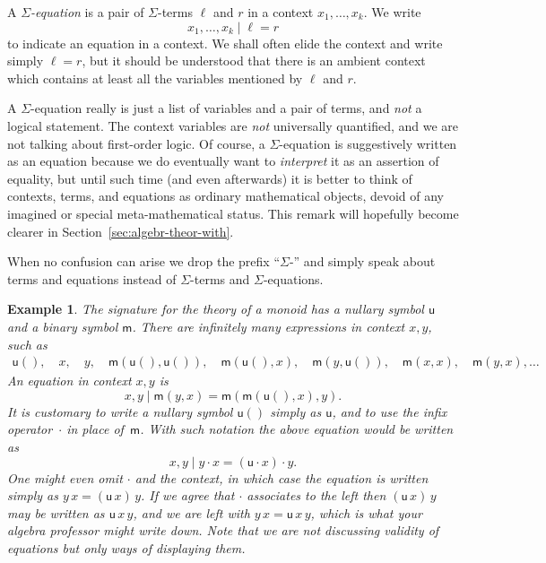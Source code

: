 \documentclass{amsart}
\newtheorem{example}{Example}[section]
\begin{document}
A \emph{$\Sigma$-equation} is a pair of $\Sigma$-terms $\ell$ and $r$ in a context
$x_1, \ldots, x_k$. We write
%
\begin{equation*}
  x_1, \ldots, x_k \mid \ell = r
\end{equation*}
%
to indicate an equation in a context. We shall often elide the context and write simply
$\ell = r$, but it should be understood that there is an ambient context which contains at
least all the variables mentioned by $\ell$ and $r$.

A $\Sigma$-equation really is just a list of variables and a pair of terms, and
\emph{not} a logical statement. The context variables are \emph{not} universally
quantified, and we are not talking about first-order logic. Of course, a
$\Sigma$-equation is suggestively written as an equation because we do
eventually want to \emph{interpret} it as an assertion of equality, but until
such time (and even afterwards) it is better to think of contexts, terms, and
equations as ordinary mathematical objects, devoid of any imagined or special
meta-mathematical status. This remark will hopefully become clearer in
Section~\ref{sec:algebr-theor-with}.

When no confusion can arise we drop the prefix ``$\Sigma$-'' and simply speak about
terms and equations instead of $\Sigma$-terms and $\Sigma$-equations.


\begin{example}
  \label{ex:monoid-signature}
  The signature for the theory of a monoid has a nullary symbol $\mathsf{u}$ and a binary
  symbol $\mathsf{m}$. There are infinitely many expressions in context $x, y$, such as
  \begin{align*}
    \mathsf{u}(),\quad
    x,\quad
    y,\quad
    \mathsf{m}(\mathsf{u}(), \mathsf{u}()),\quad
    \mathsf{m}(\mathsf{u}(), x),\quad
    \mathsf{m}(y, \mathsf{u}()),\quad
    \mathsf{m}(x, x),\quad
    \mathsf{m}(y, x),
    \ldots
  \end{align*}
  An equation in context $x, y$ is
  \begin{equation*}
    x, y \mid \mathsf{m}(y, x) = \mathsf{m}(\mathsf{m}(\mathsf{u}(), x), y).
  \end{equation*}
  It is customary to write a nullary symbol $\mathsf{u}()$ simply as $\mathsf{u}$, and to
  use the infix operator~$\cdot$ in place of~$\mathsf{m}$. With such notation the
  above equation would be written as
  \begin{equation*}
    x, y \mid y \cdot x = (\mathsf{u} \cdot x) \cdot y.
  \end{equation*}
  One might even omit $\cdot$ and the context, in which case the equation is
  written simply as $y \, x = (\mathsf{u} \, x) \, y$. If we agree that $\cdot$
  associates to the left then $(\mathsf{u} \, x) \, y$ may be written as
  $\mathsf{u} \, x \, y$, and we are left with $y \, x = \mathsf{u} \, x \, y$,
  which is what your algebra professor might write down. Note that we are
  \emph{not} discussing validity of equations but only ways of displaying them.
\end{example}
\end{document}
